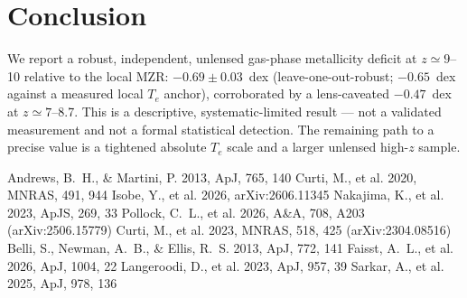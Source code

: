 \documentclass[twocolumn]{aastex631}
\begin{document}
\section{Conclusion}
We report a robust, independent, unlensed gas-phase metallicity deficit at $z\simeq9$--10 relative to the
local MZR: $-0.69\pm0.03$~dex (leave-one-out-robust; $-0.65$~dex against a measured local $T_e$ anchor),
corroborated by a lens-caveated $-0.47$~dex at $z\simeq7$--8.7. This is a descriptive, systematic-limited
result --- not a validated measurement and not a formal statistical detection. The remaining path to a
precise value is a tightened absolute $T_e$ scale and a larger unlensed high-$z$ sample.

\begin{thebibliography}{}
 Andrews, B.~H., \& Martini, P. 2013, ApJ, 765, 140
 Curti, M., et al. 2020, MNRAS, 491, 944
 Isobe, Y., et al. 2026, arXiv:2606.11345
 Nakajima, K., et al. 2023, ApJS, 269, 33
 Pollock, C.~L., et al. 2026, A\&A, 708, A203 (arXiv:2506.15779)
 Curti, M., et al. 2023, MNRAS, 518, 425 (arXiv:2304.08516)
 Belli, S., Newman, A.~B., \& Ellis, R.~S. 2013, ApJ, 772, 141
 Faisst, A.~L., et al. 2026, ApJ, 1004, 22
 Langeroodi, D., et al. 2023, ApJ, 957, 39
 Sarkar, A., et al. 2025, ApJ, 978, 136
\end{thebibliography}
\end{document}
